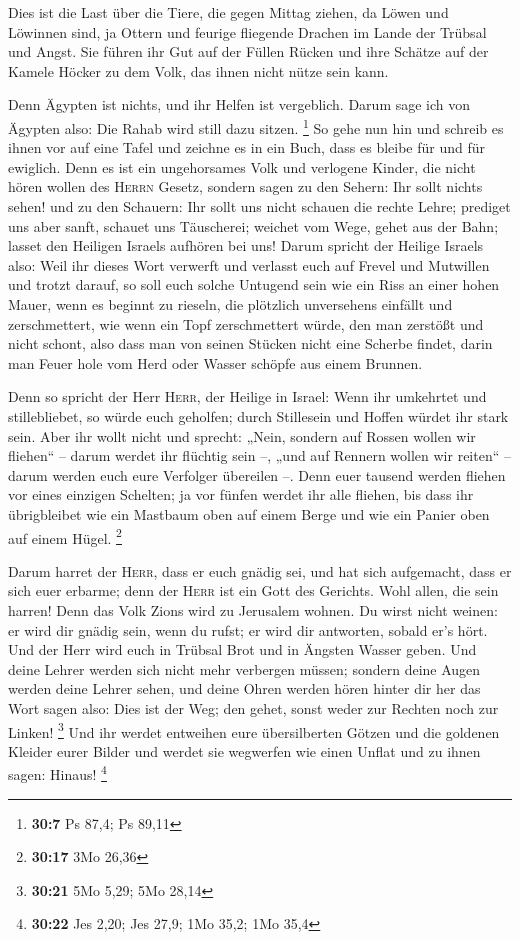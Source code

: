  Dies ist die Last über die Tiere, die gegen Mittag
ziehen, da Löwen und Löwinnen sind, ja Ottern und feurige fliegende
Drachen im Lande der Trübsal und Angst. Sie führen ihr Gut auf der
Füllen Rücken und ihre Schätze auf der Kamele Höcker zu dem Volk, das
ihnen nicht nütze sein kann.

 Denn Ägypten ist nichts, und ihr Helfen ist vergeblich.
Darum sage ich von Ägypten also: Die Rahab wird still dazu sitzen.
\footnote{\textbf{30:7} Ps 87,4; Ps 89,11}  So gehe nun
hin und schreib es ihnen vor auf eine Tafel und zeichne es in ein Buch,
dass es bleibe für und für ewiglich.  Denn es ist ein
ungehorsames Volk und verlogene Kinder, die nicht hören wollen des
\textsc{Herrn} Gesetz,  sondern sagen zu den Sehern: Ihr
sollt nichts sehen! und zu den Schauern: Ihr sollt uns nicht schauen die
rechte Lehre; prediget uns aber sanft, schauet uns Täuscherei;
 weichet vom Wege, gehet aus der Bahn; lasset den
Heiligen Israels aufhören bei uns!  Darum spricht der
Heilige Israels also: Weil ihr dieses Wort verwerft und verlasst euch
auf Frevel und Mutwillen und trotzt darauf,  so soll euch
solche Untugend sein wie ein Riss an einer hohen Mauer, wenn es beginnt
zu rieseln, die plötzlich unversehens einfällt und zerschmettert,
 wie wenn ein Topf zerschmettert würde, den man zerstößt
und nicht schont, also dass man von seinen Stücken nicht eine Scherbe
findet, darin man Feuer hole vom Herd oder Wasser schöpfe aus einem
Brunnen.

 Denn so spricht der Herr \textsc{Herr}, der Heilige in
Israel: Wenn ihr umkehrtet und stillebliebet, so würde euch geholfen;
durch Stillesein und Hoffen würdet ihr stark sein. Aber ihr wollt nicht
 und sprecht: „Nein, sondern auf Rossen wollen wir
fliehen`` -- darum werdet ihr flüchtig sein --, „und auf Rennern wollen
wir reiten`` -- darum werden euch eure Verfolger übereilen --.
 Denn euer tausend werden fliehen vor eines einzigen
Schelten; ja vor fünfen werdet ihr alle fliehen, bis dass ihr
übrigbleibet wie ein Mastbaum oben auf einem Berge und wie ein Panier
oben auf einem Hügel. \footnote{\textbf{30:17} 3Mo 26,36}

 Darum harret der \textsc{Herr}, dass er euch gnädig sei,
und hat sich aufgemacht, dass er sich euer erbarme; denn der
\textsc{Herr} ist ein Gott des Gerichts. Wohl allen, die sein harren!
 Denn das Volk Zions wird zu Jerusalem wohnen. Du wirst
nicht weinen: er wird dir gnädig sein, wenn du rufst; er wird dir
antworten, sobald er's hört.  Und der Herr wird euch in
Trübsal Brot und in Ängsten Wasser geben. Und deine Lehrer werden sich
nicht mehr verbergen müssen; sondern deine Augen werden deine Lehrer
sehen,  und deine Ohren werden hören hinter dir her das
Wort sagen also: Dies ist der Weg; den gehet, sonst weder zur Rechten
noch zur Linken! \footnote{\textbf{30:21} 5Mo 5,29; 5Mo 28,14}
 Und ihr werdet entweihen eure übersilberten Götzen und
die goldenen Kleider eurer Bilder und werdet sie wegwerfen wie einen
Unflat und zu ihnen sagen: Hinaus! \footnote{\textbf{30:22} Jes 2,20;
  Jes 27,9; 1Mo 35,2; 1Mo 35,4}

